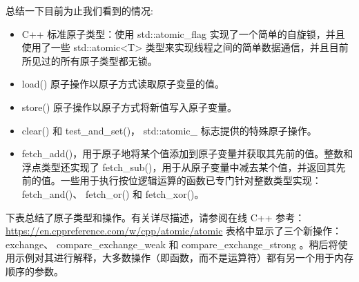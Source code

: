 总结一下目前为止我们看到的情况:

\begin{itemize}
\item
C++ 标准原子类型：使用 std::atomic\_flag 实现了一个简单的自旋锁，并且使用了一些 std::atomic<T> 类型来实现线程之间的简单数据通信，并且目前所见过的所有原子类型都无锁。

\item
load() 原子操作以原子方式读取原子变量的值。

\item
store() 原子操作以原子方式将新值写入原子变量。

\item
clear() 和 test\_and\_set()， std::atomic\_ 标志提供的特殊原子操作。

\item
fetch\_add()，用于原子地将某个值添加到原子变量并获取其先前的值。整数和浮点类型还实现了 fetch\_sub()，用于从原子变量中减去某个值，并返回其先前的值。一些用于执行按位逻辑运算的函数已专门针对整数类型实现： fetch\_and()、 fetch\_or() 和 fetch\_xor()。
\end{itemize}

下表总结了原子类型和操作。有关详尽描述，请参阅在线 C++ 参考： \url{https://en.cppreference.com/w/cpp/atomic/atomic} 表格中显示了三个新操作： exchange、 compare\_exchange\_weak 和 compare\_exchange\_strong 。稍后将使用示例对其进行解释，大多数操作（即函数，而不是运算符）都有另一个用于内存顺序的参数。


